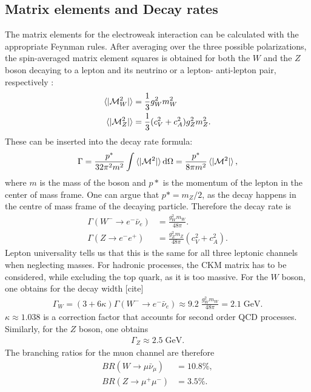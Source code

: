 \documentclass[twoside,        %
               BCOR12mm,       %
               ngerman,english, %
               fleqn,headsepline=false,footsepline=false
              ]{Vorlage/MFPREPORT}
\renewcommand{\d}{\ensuremath{\mathrm{d}}} %
\begin{document}
\subsection{Matrix elements and Decay rates}
The matrix elements for the electroweak interaction can be calculated with the
appropriate Feynman rules.
After averaging over the three possible polarizations, the spin-averaged matrix
element squares is obtained for both the $W$ and the $Z$ boson decaying to a
lepton and its neutrino or a lepton- anti-lepton pair, respectively
\cite[p.;242,411]{thomson}:
\begin{align}
    \label{eq:spinavg}
    \braket{|\mathcal{M}_W^2|}&=\frac{1}{3}g_W^2m_W^2\\
    \braket{|\mathcal{M}_Z^2|}&=\frac{1}{3}(c_V^2+c_A^2)g_Z^2m_Z^2.
\end{align}
These can be inserted into the decay rate formula: \cite[p.]{thomson}
\begin{align}
    \label{eq:decayrate}
    \Gamma=\frac{p^*}{32\pi^2m^2}\int
    \braket{|\mathcal{M}^2|}\d\Omega=\frac{p^*}{8\pi m^2}
    \braket{|\mathcal{M}^2|},
\end{align}
where $m$ is the mass of the boson and $p*$ is the momentum of the lepton in
the center of mass frame.
One can argue that $p*=m_Z/2$, as the
decay happens in the centre of mass frame of the decaying particle.
Therefore the decay rate is 
\begin{align}
    \label{eq:decay}
    \Gamma(W^-\rightarrow e^- \bar{\nu}_e)&=\frac{g_W^2m_W}{48\pi}.\\
    \Gamma(Z\rightarrow e^- e^+)&=\frac{g_Z^2m_Z}{48\pi}(c_V^2+c_A^2).
\end{align}
Lepton universality tells us that this is the same for all three leptonic
channels when neglecting masses. For hadronic processes, the CKM matrix has to
be considered, while excluding the top quark, as it is too massive.
For the $W$ boson, one obtains for the decay width [cite]
\begin{align}
\Gamma_W=(3+6 \kappa)\Gamma(W^-\rightarrow e^-
\bar\nu_e)\approx9.2\;\frac{g_W^2m_W}{48\pi}=2.1\;\text{GeV.}
    \label{eq:gammaw}
\end{align}
$\kappa\approx1.038$ is a correction factor that accounts for second order QCD processes.
Similarly, for the $Z$ boson, one obtains
\begin{align}
    \Gamma_Z\approx2.5\;\text{GeV.}    \label{eq:gammaZ}
\end{align}
The branching ratios for the muon channel are therefore
\begin{align}
    BR(W\rightarrow\mu\bar\nu_\mu)&=10.8\%,\\
    BR(Z\rightarrow\mu^+\mu^-)&=3.5\%.
    \label{eq:branches}
\end{align}
\end{document}
